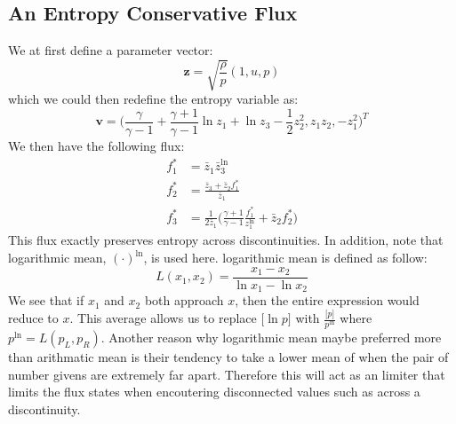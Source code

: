 \documentclass[a4paper]{article}
\numberwithin{equation}{section}
\begin{document}
\subsection{An Entropy Conservative Flux}
We at first define a parameter vector:
\begin{equation}
    \mathbf{z} = \sqrt{\frac{\rho}{p}} (1, u, p)
\end{equation}
which we could then redefine the entropy variable as:
\begin{equation}
    \mathbf{v} = \big(\frac{\gamma}{\gamma - 1} + \frac{\gamma + 1}{\gamma -1} \ln z_1 + \ln z_3 - \frac{1}{2} z_2^2, z_1 z_2, -z_1^2\big)^T
\end{equation}
We then have the following flux:
\begin{equation}
    \begin{split}
        f_1^* &= \bar{z}_1 \bar{z}_3^{\ln}\\
        f_2^* &= \frac{\bar{z}_3 + \bar{z}_2 f_1^*}{\bar{z}_1}\\
        f_3^* &= \frac{1}{2\bar{z}_1}\big(\frac{\gamma + 1}{\gamma -1} \frac{f_1^*}{z_1^{\ln}} + \bar{z}_2 f_2^* \big)
    \end{split}
\end{equation}
This flux exactly preserves entropy across discontinuities. In addition, note that logarithmic mean, $(\cdot)^{\ln}$, is used here. 
logarithmic mean is defined as follow:
\begin{equation}
    L(x_1,x_2) = \frac{x_1 - x_2}{\ln x_1 - \ln x_2}
\end{equation}
We see that if $x_1$ and $x_2$ both approach $x$, then the entire expression would reduce to $x$. This average allows us to replace $\big[\ln p\big]$ with $\frac{\big[p\big]}{p^{\ln}}$ where $p^{\ln} = L(p_L,p_R)$.
Another reason why logarithmic mean maybe preferred more than arithmatic mean is their tendency to take a lower mean of when the pair of number givens are extremely far apart. Therefore this will act as an limiter that limits the flux states when encoutering disconnected values such as across a discontinuity. 
\end{document}
